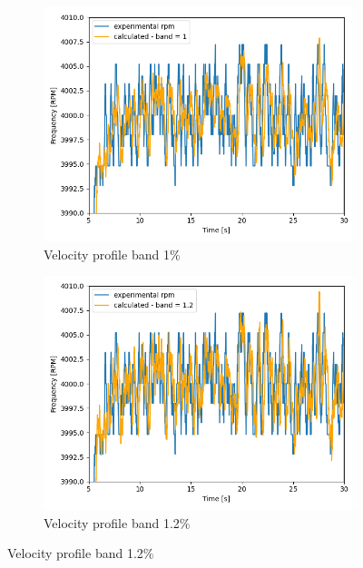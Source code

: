 \documentclass[10pt,fleqn,a4paper,twoside]{article}
\begin{document}
\begin{figure}[H]
\begin{subfigure}{0.4\textwidth}
        \end{subfigure}
        \centering
        \hfill
        \begin{subfigure}{0.4\textwidth}
            \includegraphics[width=\textwidth]{Figures/rpm_analysis_mic8_band_1.png}
            \caption{Velocity profile band 1\%}
            \label{fig:fourth}
        \end{subfigure}
        \centering
        \hfill
        \begin{subfigure}{0.4\textwidth}
            \includegraphics[width=\textwidth]{Figures/rpm_analysis_mic8_band_1.2.png}
            \caption{Velocity profile band 1.2\%}
            \label{fig:fifth}
        \end{subfigure}

\end{figure}
\end{document}
